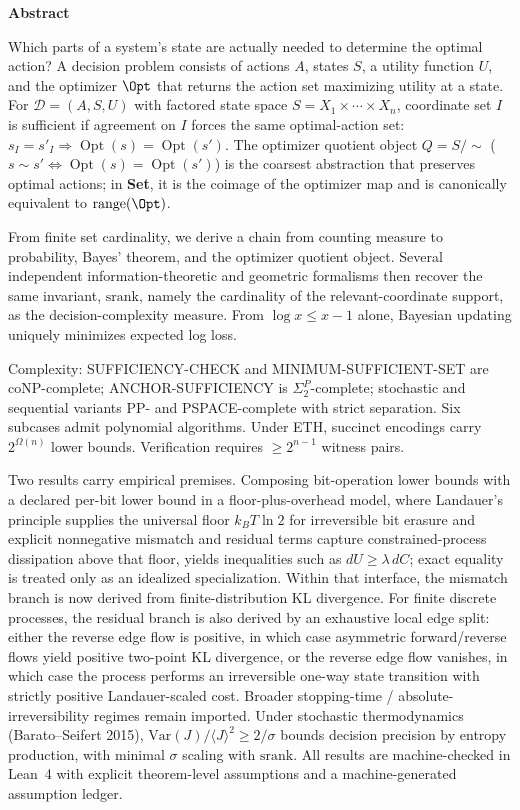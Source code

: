 \textbf{Abstract}

Which parts of a system's state are actually needed to determine the optimal action? A decision problem consists of actions $A$, states $S$, a utility function $U$, and the optimizer $\Opt$ that returns the action set maximizing utility at a state. For $\mathcal{D}=(A,S,U)$ with factored state space $S=X_1\times\cdots\times X_n$, coordinate set $I$ is sufficient if agreement on $I$ forces the same optimal-action set: $s_I=s'_I\Rightarrow\operatorname{Opt}(s)=\operatorname{Opt}(s')$. The optimizer quotient object $Q=S/{\sim}$ ($s\sim s'\Leftrightarrow\operatorname{Opt}(s)=\operatorname{Opt}(s')$) is the coarsest abstraction that preserves optimal actions; in \textbf{Set}, it is the coimage of the optimizer map and is canonically equivalent to $\operatorname{range}(\Opt)$.

From finite set cardinality, we derive a chain from counting measure to probability, Bayes' theorem, and the optimizer quotient object. Several independent information-theoretic and geometric formalisms then recover the same invariant, $\mathrm{srank}$, namely the cardinality of the relevant-coordinate support, as the decision-complexity measure. From $\log x\leq x-1$ alone, Bayesian updating uniquely minimizes expected log loss.

Complexity: SUFFICIENCY-CHECK and MINIMUM-SUFFICIENT-SET are coNP-complete; ANCHOR-SUFFICIENCY is $\Sigma_2^P$-complete; stochastic and sequential variants PP- and PSPACE-complete with strict separation. Six subcases admit polynomial algorithms. Under ETH, succinct encodings carry $2^{\Omega(n)}$ lower bounds. Verification requires $\geq 2^{n-1}$ witness pairs.

Two results carry empirical premises. Composing bit-operation lower bounds with a declared per-bit lower bound in a floor-plus-overhead model, where Landauer's principle supplies the universal floor $k_BT\ln 2$ for irreversible bit erasure and explicit nonnegative mismatch and residual terms capture constrained-process dissipation above that floor, yields inequalities such as $dU\geq\lambda\,dC$; exact equality is treated only as an idealized specialization. Within that interface, the mismatch branch is now derived from finite-distribution KL divergence. For finite discrete processes, the residual branch is also derived by an exhaustive local edge split: either the reverse edge flow is positive, in which case asymmetric forward/reverse flows yield positive two-point KL divergence, or the reverse edge flow vanishes, in which case the process performs an irreversible one-way state transition with strictly positive Landauer-scaled cost. Broader stopping-time / absolute-irreversibility regimes remain imported. Under stochastic thermodynamics (Barato--Seifert 2015), $\mathrm{Var}(J)/\langle J\rangle^2\geq 2/\sigma$ bounds decision precision by entropy production, with minimal $\sigma$ scaling with $\mathrm{srank}$. All results are machine-checked in Lean~4 with explicit theorem-level assumptions and a machine-generated assumption ledger.
